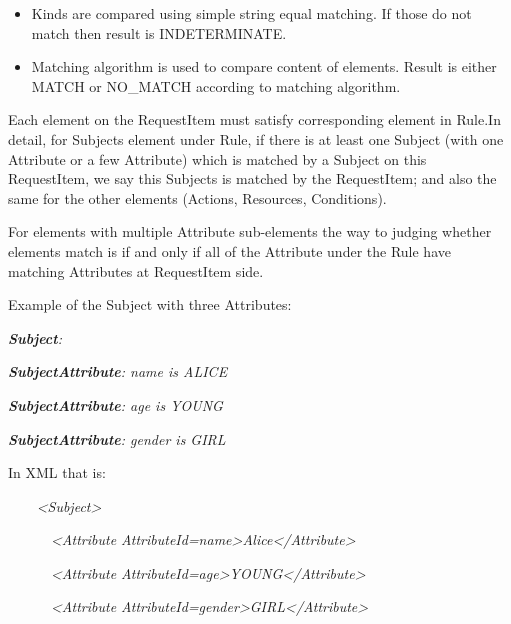 \documentclass{article}
\newcommand\liststyleWWviiiNumxxiii{%
\renewcommand\theenumi{\arabic{enumi}}
\renewcommand\theenumii{\arabic{enumii}}
\renewcommand\theenumiii{\arabic{enumiii}}
\renewcommand\labelitemi{{}-}
\renewcommand\labelenumi{\theenumi.}
\renewcommand\labelenumii{\theenumii.}
\renewcommand\labelenumiii{\theenumiii.}
}
\begin{document}
\liststyleWWviiiNumxxiii
\begin{itemize}
\item {\color{black}
Kinds are compared using simple string equal matching. If those do not
match then result is INDETERMINATE.}
\item {\color{black}
Matching algorithm is used to compare content of elements. Result is
either MATCH or NO\_MATCH according to matching algorithm.}
\end{itemize}
{\color{black}
Each element on the RequestItem must satisfy corresponding element in
Rule.In detail, for Subjects element under Rule, if there is at least
one Subject (with one Attribute or a few Attribute) which is matched by
a Subject on this RequestItem, we say this Subjects is matched by the
RequestItem; and also the same for the other elements (Actions,
Resources, Conditions).}

{\upshape\color{black}
For elements with multiple Attribute sub-elements the way to judging
whether elements match is if and only if all of the Attribute under the
Rule have matching Attributes at RequestItem side.}

{\upshape\color{black}
Example of the Subject with three Attributes:}

{\upshape\color{black}
\textbf{\textit{Subject}}\textit{:}}

{\color{black}
\textbf{\textit{SubjectAttribute}}\textit{: name is ALICE}}

{\color{black}
\textbf{\textit{SubjectAttribute}}\textit{: age is YOUNG}}

{\color{black}
\textbf{\textit{SubjectAttribute}}\textit{: gender is GIRL}}

{\upshape\color{black}
In XML that is:}

{\color{black}
\textit{\ \ \ \ }\textit{{\textless}Subject{\textgreater}}}

{\color{black}
\textit{\ \ \ \ \ \ }\textit{{\textless}Attribute
AttributeId={\textquotedbl}name{\textquotedbl}{\textgreater}Alice{\textless}/Attribute{\textgreater}}}

{\color{black}
\textit{\ \ \ \ \ \ }\textit{{\textless}Attribute
AttributeId={\textquotedbl}age{\textgreater}YOUNG{\textless}/Attribute{\textgreater}}}

{\color{black}
\textit{\ \ \ \ \ \ }\textit{{\textless}Attribute
AttributeId={\textquotedbl}gender{\textgreater}GIRL{\textless}/Attribute{\textgreater}}}
\end{document}
